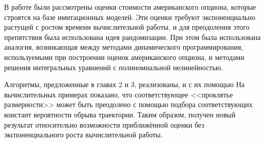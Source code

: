 \conclusion

В работе были рассмотрены оценки стоимости американского опциона, которые строятся на базе имитационных моделей. Эти оценки требуют экспоненциально растущей с ростом времени вычислительной работы, и для преодоления этого препятствия была использована идея рандомизации. При этом была использована аналогия, возникающая между методами динамического программирования, используемыми при построении оценок американского опциона, и методами решения интегральных уравнений с полиномиальной нелинейностью.

Алгоритмы, предложенные в главах 2 и 3, реализованы, и с их помощью 
На вычислительных примерах показано, что соответствующее <<проклятье размерности>> может быть преодолено с помощью подбора соответствующих констант вероятности обрыва траектории. Таким образом, получен новый результат относительно возможности приближённой оценки без экспоненциального роста вычислительной работы.
